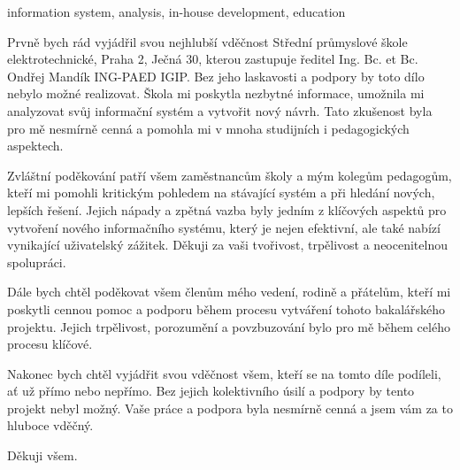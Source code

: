\documentclass[FM,Proj]{tulthesis}
\begin{document}
\begin{keywordsEN}
information system, analysis, in-house development, education
\end{keywordsEN}

\clearpage

\begin{acknowledgement}
Prvně bych rád vyjádřil svou nejhlubší vděčnost Střední průmyslové
škole elektrotechnické, Praha 2, Ječná 30, kterou zastupuje 
ředitel Ing. Bc. et Bc. Ondřej Mandík ING-PAED IGIP. Bez 
jeho laskavosti a podpory by toto dílo nebylo možné realizovat. 
Škola mi poskytla nezbytné informace, umožnila mi analyzovat svůj 
informační systém a vytvořit nový návrh. Tato zkušenost byla pro mě 
nesmírně cenná a pomohla mi v mnoha studijních i pedagogických aspektech.

Zvláštní poděkování patří všem zaměstnancům školy a mým kolegům 
pedagogům, kteří mi pomohli kritickým pohledem na stávající 
systém a při hledání nových, lepších řešení. Jejich nápady a 
zpětná vazba byly jedním z klíčových aspektů pro vytvoření nového 
informačního systému, který je nejen efektivní, ale také nabízí 
vynikající uživatelský zážitek. Děkuji za vaši tvořivost, 
trpělivost a neocenitelnou spolupráci.

Dále bych chtěl poděkovat všem členům mého vedení, rodině a 
přátelům, kteří mi poskytli cennou pomoc a podporu během procesu 
vytváření tohoto bakalářského projektu. Jejich trpělivost, 
porozumění a povzbuzování bylo pro mě během celého procesu klíčové.

Nakonec bych chtěl vyjádřit svou vděčnost všem, kteří se na tomto 
díle podíleli, ať už přímo nebo nepřímo. Bez jejich kolektivního 
úsilí a podpory by tento projekt nebyl možný. Vaše práce a podpora
byla nesmírně cenná a jsem vám za to hluboce vděčný.

Děkuji všem.
\end{acknowledgement}

\tableofcontents

\clearpage
\end{document}
